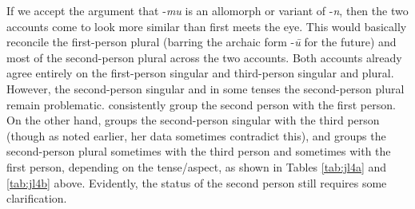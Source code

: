 \documentclass[output=paper]{langsci/langscibook}
\begin{document}
\begin{table}
\caption{Person suffixes according to \cite{CainGair2000}}
\label{tab:jl4b}	
\end{table}


 If we accept the argument that -\textit{mu} is an allomorph or variant of -\textit{n}, then the two accounts come to look more similar than first meets the eye. This would basically reconcile the first-person plural (barring the archaic form -\textit{ū} for the future) and most of the second-person plural across the two accounts. Both accounts already agree entirely on the first-person singular and third-person singular and plural. However, the second-person singular and in some tenses the second-person plural remain problematic. \cite{CainGair2000} consistently group the second person with the first person. On the other hand, \cite{Fritz2002} groups the second-person singular with the third person (though as noted earlier, her data sometimes contradict this), and groups the second-person plural sometimes with the third person and sometimes with the first person, depending on the tense/aspect, as shown in Tables \ref{tab:jl4a} and \ref{tab:jl4b} above. Evidently, the status of the second person still requires some clarification. 
\end{document}
